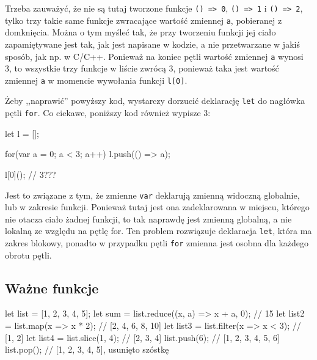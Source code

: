 Trzeba zauważyć, że nie są tutaj tworzone funkcje \texttt{() => 0}, \texttt{() => 1} i \texttt{() => 2}, tylko trzy takie same funkcje zwracające wartość zmiennej \texttt{a}, pobieranej z domknięcia. Można o tym myśleć tak, że przy tworzeniu funkcji jej ciało zapamiętywane jest tak, jak jest napisane w kodzie, a nie przetwarzane w jakiś sposób, jak np. w C/C++. Ponieważ na koniec pętli wartość zmiennej \texttt{a} wynosi 3, to wszystkie trzy funkcje w liście zwrócą 3, ponieważ taka jest wartość zmiennej \texttt{a} w momencie wywołania funkcji \texttt{l[0]}.

Żeby ,,naprawić'' powyższy kod, wystarczy dorzucić deklarację \texttt{let} do nagłówka pętli \texttt{for}. Co ciekawe, poniższy kod również wypisze 3:
\begin{js}
    let l = [];
    
    for(var a = 0; a < 3; a++) {
        l.push(() => a);
    }
    
    l[0](); // 3???
\end{js}

Jest to związane z tym, że zmienne \texttt{var} deklarują zmienną widoczną globalnie, lub w zakresie funkcji. Ponieważ tutaj jest ona zadeklarowana w miejscu, którego nie otacza ciało żadnej funkcji, to tak naprawdę jest zmienną globalną, a nie lokalną ze względu na pętlę for. Ten problem rozwiązuje deklaracja \texttt{let}, która ma zakres blokowy, ponadto w przypadku pętli \texttt{for} zmienna jest osobna dla każdego obrotu pętli.

\subsection{Ważne funkcje}
\begin{js}
    let list = [1, 2, 3, 4, 5];
    let sum = list.reduce((x, a) => x + a, 0); // 15 
    let list2 = list.map(x => x * 2); // [2, 4, 6, 8, 10]
    let list3 = list.filter(x => x < 3); // [1, 2]
    let list4 = list.slice(1, 4); // [2, 3, 4]
    list.push(6); // [1, 2, 3, 4, 5, 6]
    list.pop(); // [1, 2, 3, 4, 5], usunięto szóstkę
\end{js}

